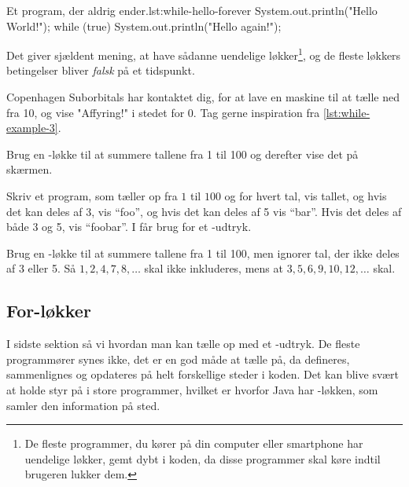 		\begin{JavaCode}{Et program, der aldrig ender.}{lst:while-hello-forever}
			System.out.println("Hello World!");
			while (true) {
				System.out.println("Hello again!");
			}
		\end{JavaCode}

        Det giver sjældent mening, at have sådanne uendelige
        løkker\footnote{De fleste programmer, du kører på din computer
        eller smartphone har uendelige løkker, gemt dybt i koden, da
        disse programmer skal køre indtil brugeren lukker dem.}, og de
        fleste løkkers betingelser bliver \emph{falsk} på et
        tidspunkt.

		\begin{exercise}
			Copenhagen Suborbitals har kontaktet dig, for at lave en maskine til
            at tælle ned fra 10, og vise "Affyring!" i stedet for 0.
            Tag gerne inspiration fra
            \autoref{lst:while-example-3}.
		\end{exercise}

		\begin{exercise}
            Brug en -løkke til at summere tallene
            fra 1 til 100 og derefter vise det på skærmen.
		\end{exercise}

		\begin{exercise}
            Skriv et program, som tæller op fra \(1\) til \(100\) og
            for hvert tal, vis tallet, og hvis det kan deles af 3, vis
            ``foo'', og hvis det kan deles af 5 vis ``bar''. Hvis det
            deles af både 3 og 5, vis ``foobar''.  I får brug for et
            -udtryk.
        \end{exercise}

		\begin{exercise}
            Brug en -løkke til at summere tallene
            fra 1 til 100, men ignorer tal, der ikke deles af 3 eller
            5. Så \(1, 2, 4, 7, 8, \dots\) skal ikke inkluderes, mens
            at \(3, 5, 6, 9, 10, 12, \dots\) skal.
        \end{exercise}

	\subsection{For-løkker}

		I sidste sektion så vi hvordan man kan tælle op med et -udtryk.
        De fleste programmører synes ikke, det er en god måde at tælle
        på, da  defineres, sammenlignes og opdateres på
        helt forskellige steder i koden.  Det kan blive svært at holde
        styr på i store programmer, hvilket er hvorfor Java har
        -løkken, som samler den information på sted.


